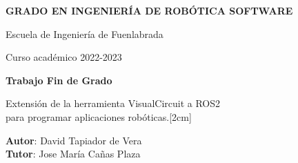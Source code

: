 \thispagestyle{empty}
\vspace{2cm}

\begin{figure}[htb]
  \centerline{}
\end{figure}

\begin{center}
  {\Large {\bf GRADO EN INGENIERÍA DE ROBÓTICA SOFTWARE}}
  \vspace{5mm}
 
  {\large {Escuela de Ingeniería de Fuenlabrada}}
  \vspace{5mm}

  {\large {Curso académico 2022-2023}}

  \vspace{1cm}

  {\large {\bf Trabajo Fin de Grado}}

  \vspace{2cm}

  {\Large {Extensión de la herramienta VisualCircuit a ROS2\\
      para programar aplicaciones robóticas.[2cm] }}

  \vspace{5cm}
  {\bf Autor}: David Tapiador de Vera\\
  {\bf Tutor}: Jose María Cañas Plaza
\end{center}

\clearpage
\thispagestyle{empty}
